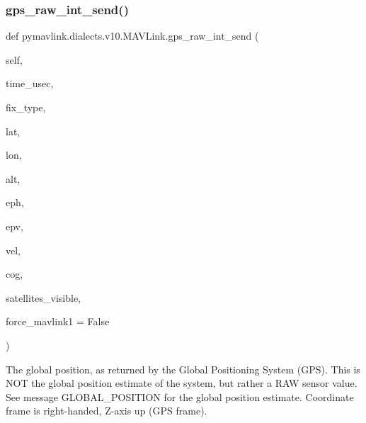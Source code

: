 \begin{DoxyVerb}
\begin{DoxyVerb}
\subsubsection{\texorpdfstring{gps\+\_\+raw\+\_\+int\+\_\+send()}{gps\_raw\_int\_send()}}
{\footnotesize\ttfamily def pymavlink.\+dialects.\+v10.\+M\+A\+V\+Link.\+gps\+\_\+raw\+\_\+int\+\_\+send (\begin{DoxyParamCaption}\item[{}]{self,  }\item[{}]{time\+\_\+usec,  }\item[{}]{fix\+\_\+type,  }\item[{}]{lat,  }\item[{}]{lon,  }\item[{}]{alt,  }\item[{}]{eph,  }\item[{}]{epv,  }\item[{}]{vel,  }\item[{}]{cog,  }\item[{}]{satellites\+\_\+visible,  }\item[{}]{force\+\_\+mavlink1 = {\ttfamily False} }\end{DoxyParamCaption})}

\begin{DoxyVerb}The global position, as returned by the Global Positioning System
(GPS). This is                 NOT the global position
estimate of the system, but rather a RAW sensor value.
See message GLOBAL_POSITION for the global position
estimate. Coordinate frame is right-handed, Z-axis up
(GPS frame).


\end{DoxyVerb}
\end{DoxyVerb}
\end{DoxyVerb}
